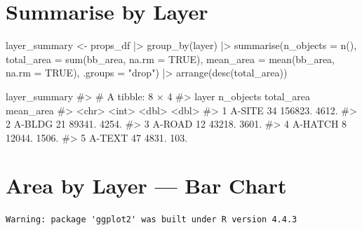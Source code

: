 \documentclass[
  11pt,
  letterpaper,
  DIV=11,
  numbers=noendperiod]{scrreprt}
\newenvironment{Shaded}{\begin{snugshade}}{\end{snugshade}}
\newcommand{\AttributeTok}[1]{\textcolor[rgb]{0.40,0.45,0.13}{#1}}
\newcommand{\CommentTok}[1]{\textcolor[rgb]{0.37,0.37,0.37}{#1}}
\newcommand{\ConstantTok}[1]{\textcolor[rgb]{0.56,0.35,0.01}{#1}}
\newcommand{\FunctionTok}[1]{\textcolor[rgb]{0.28,0.35,0.67}{#1}}
\newcommand{\NormalTok}[1]{\textcolor[rgb]{0.00,0.23,0.31}{#1}}
\newcommand{\OtherTok}[1]{\textcolor[rgb]{0.00,0.23,0.31}{#1}}
\newcommand{\SpecialCharTok}[1]{\textcolor[rgb]{0.37,0.37,0.37}{#1}}
\newcommand{\StringTok}[1]{\textcolor[rgb]{0.13,0.47,0.30}{#1}}
\begin{document}
\section{Summarise by Layer}\label{summarise-by-layer}

\begin{Shaded}
\begin{Highlighting}[]
\NormalTok{layer\_summary }\OtherTok{\textless{}{-}}\NormalTok{ props\_df }\SpecialCharTok{|\textgreater{}}
  \FunctionTok{group\_by}\NormalTok{(layer) }\SpecialCharTok{|\textgreater{}}
  \FunctionTok{summarise}\NormalTok{(}\AttributeTok{n\_objects  =} \FunctionTok{n}\NormalTok{(),}
            \AttributeTok{total\_area =} \FunctionTok{sum}\NormalTok{(bb\_area, }\AttributeTok{na.rm =} \ConstantTok{TRUE}\NormalTok{),}
            \AttributeTok{mean\_area  =} \FunctionTok{mean}\NormalTok{(bb\_area, }\AttributeTok{na.rm =} \ConstantTok{TRUE}\NormalTok{),}
            \AttributeTok{.groups    =} \StringTok{"drop"}\NormalTok{) }\SpecialCharTok{|\textgreater{}}
  \FunctionTok{arrange}\NormalTok{(}\FunctionTok{desc}\NormalTok{(total\_area))}

\NormalTok{layer\_summary}
\CommentTok{\#\textgreater{} \# A tibble: 8 × 4}
\CommentTok{\#\textgreater{}   layer    n\_objects total\_area mean\_area}
\CommentTok{\#\textgreater{}   \textless{}chr\textgreater{}        \textless{}int\textgreater{}      \textless{}dbl\textgreater{}     \textless{}dbl\textgreater{}}
\CommentTok{\#\textgreater{} 1 A{-}SITE          34    156823.    4612.}
\CommentTok{\#\textgreater{} 2 A{-}BLDG          21     89341.    4254.}
\CommentTok{\#\textgreater{} 3 A{-}ROAD          12     43218.    3601.}
\CommentTok{\#\textgreater{} 4 A{-}HATCH          8     12044.    1506.}
\CommentTok{\#\textgreater{} 5 A{-}TEXT          47      4831.     103.}
\end{Highlighting}
\end{Shaded}

\section{Area by Layer --- Bar Chart}\label{area-by-layer-bar-chart}

\begin{verbatim}
Warning: package 'ggplot2' was built under R version 4.4.3
\end{verbatim}
\end{document}
